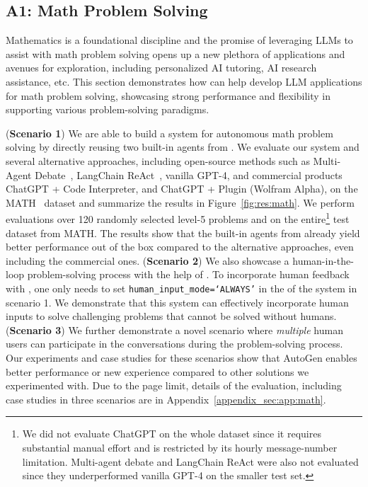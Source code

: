   \subsection*{A1: Math Problem Solving} \label{sec:app:math}

Mathematics is a foundational discipline and the promise of leveraging LLMs to assist with math problem solving opens up a new plethora of applications and avenues for exploration,
including personalized AI tutoring, AI research assistance, etc. This section demonstrates how \libName can help develop LLM applications for math problem solving, showcasing strong performance and flexibility in supporting various problem-solving paradigms. 

(\textbf{Scenario 1}) We are able to build a system for autonomous math problem solving by directly reusing two built-in agents from \libName. We evaluate our system and several alternative approaches, including open-source methods such as Multi-Agent Debate~\cite{liang-arxiv2023}, LangChain ReAct~\cite{langchain}, vanilla GPT-4, and commercial products ChatGPT + Code Interpreter, and ChatGPT + Plugin (Wolfram Alpha), on the MATH~\cite{hendrycks2021measuring} dataset and summarize the results in Figure~\ref{fig:res:math}. 
We perform evaluations over 120 randomly selected level-5 problems and on the entire\footnote{We did not evaluate ChatGPT on the whole dataset since it requires substantial manual effort and is restricted by its hourly message-number limitation. Multi-agent debate and LangChain ReAct were also not evaluated since they underperformed vanilla GPT-4 on the smaller test set.} test dataset from MATH.
The results show that the built-in agents from \libName already yield better performance out of the box compared to the alternative approaches, even including the commercial ones. 
(\textbf{Scenario 2}) We also showcase a human-in-the-loop problem-solving process with the help of \libName. To incorporate human feedback with \libName, one only needs to set \texttt{human\_input\_mode=`ALWAYS'} in the \UserProxyAgent of the system in scenario 1. We demonstrate that this system can effectively incorporate human inputs to solve challenging problems that cannot be solved without humans. 
(\textbf{Scenario 3}) We further demonstrate a novel scenario where {\em multiple} human users can participate in the conversations during the problem-solving process. 
Our experiments and case studies for these scenarios show that AutoGen enables better performance or new experience compared to other solutions we experimented with.
Due to the page limit, details of the evaluation, including case studies in three scenarios are in Appendix~\ref{appendix_sec:app:math}. 

